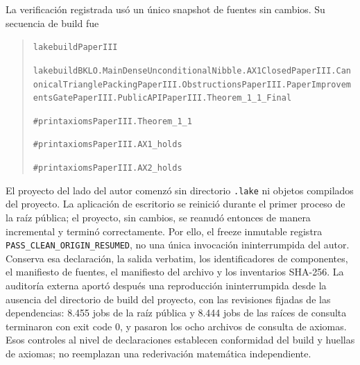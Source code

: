 \documentclass[spanish,11pt,a4paper]{article}
\begin{document}
La verificación registrada usó un único snapshot de fuentes sin cambios.
Su secuencia de build fue

\begin{quote}
{\LeanSymbols\fontsize{8}{10}\selectfont
\noindent \nolinkurl{lake}\hspace{0.45em}\nolinkurl{build}\hspace{0.45em}\nolinkurl{PaperIII}\par
\noindent \nolinkurl{lake}\hspace{0.45em}\nolinkurl{build}\hspace{0.45em}\nolinkurl{BKLO.MainDenseUnconditional}\hspace{0.45em}\nolinkurl{Nibble.AX1Closed}\hspace{0.45em}\nolinkurl{PaperIII.CanonicalTrianglePacking}\hspace{0.45em}\nolinkurl{PaperIII.Obstructions}\hspace{0.45em}\nolinkurl{PaperIII.PaperImprovementsGate}\hspace{0.45em}\nolinkurl{PaperIII.PublicAPI}\hspace{0.45em}\nolinkurl{PaperIII.Theorem_1_1_Final}\par
\noindent \nolinkurl{#print}\hspace{0.45em}\nolinkurl{axioms}\hspace{0.45em}\nolinkurl{PaperIII.Theorem_1_1}\par
\noindent \nolinkurl{#print}\hspace{0.45em}\nolinkurl{axioms}\hspace{0.45em}\nolinkurl{PaperIII.AX1_holds}\par
\noindent \nolinkurl{#print}\hspace{0.45em}\nolinkurl{axioms}\hspace{0.45em}\nolinkurl{PaperIII.AX2_holds}\par
}
\end{quote}

El proyecto del lado del autor comenzó sin directorio \nolinkurl{.lake} ni
objetos compilados del proyecto. La aplicación de escritorio se reinició
durante el primer proceso de la raíz pública; el proyecto, sin cambios,
se reanudó entonces de manera incremental y terminó correctamente. Por
ello, el freeze inmutable registra
\nolinkurl{PASS_CLEAN_ORIGIN_RESUMED}, no una única invocación
ininterrumpida del autor. Conserva esa declaración, la salida verbatim,
los identificadores de componentes, el manifiesto de fuentes, el
manifiesto del archivo y los inventarios SHA-256. La auditoría externa
aportó después una reproducción ininterrumpida desde la ausencia del
directorio de build del proyecto, con las revisiones fijadas de las
dependencias: 8.455 jobs de la raíz pública y 8.444 jobs de las raíces
de consulta terminaron con exit code 0, y pasaron los ocho archivos de
consulta de axiomas. Esos controles al nivel de declaraciones establecen
conformidad del build y huellas de axiomas; no reemplazan una
rederivación matemática independiente.
\end{document}
